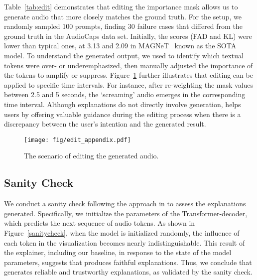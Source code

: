 Table~\ref{tab:edit} demonstrates that editing the importance mask allows us to generate audio that more closely matches the ground truth. For the setup, we randomly sampled 100 prompts, finding 30 failure cases that differed from the ground truth in the AudioCaps data set. Initially, the scores (FAD and KL) were lower than typical ones, at 3.13 and 2.09 in MAGNeT~\cite{ziv2024masked} known as the SOTA model. To understand the generated output, we used \mname{} to identify which textual tokens were over- or underemphasized, then manually adjusted the importance of the tokens to amplify or suppress. Figure~\ref{fig:edit} further illustrates that editing can be applied to specific time intervals. For instance, after re-weighting the mask values between 2.5 and 5 seconds, the ‘screaming’ audio emerges in the corresponding time interval. Although explanations do not directly involve generation, \mname{} helps users by offering valuable guidance during the editing process when there is a discrepancy between the user’s intention and the generated result.

\begin{figure}
    \center
    \texttt{[image: fig/edit\_appendix.pdf]}
    \caption{The scenario of editing the generated audio.}
    \label{fig:edit}
\end{figure}

\subsection{Sanity Check}
We conduct a sanity check following the approach in \cite{adebayo2018sanity} to assess the explanations generated. Specifically, we initialize the parameters of the Transformer-decoder, which predicts the next sequence of audio tokens. As shown in Figure~\ref{sanitycheck}, when the model is initialized randomly, the influence of each token in the visualization becomes nearly indistinguishable. This result of the explainer, including our baseline, in response to the state of the model parameters, suggests that \mname{} produces faithful explanations. Thus, we conclude that \mname{} generates reliable and trustworthy explanations, as validated by the sanity check.

